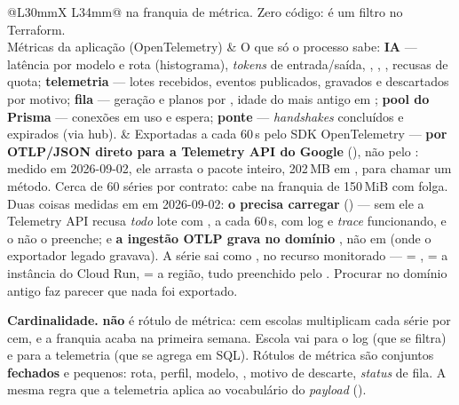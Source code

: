 \begin{tabularx}{\linewidth}{@{}L{30mm}X L{34mm}@{}}
  na franquia de métrica. Zero código: é um filtro no Terraform.\\
Métricas da aplicação (OpenTelemetry) & O que só o processo sabe:
  \textbf{IA} --- latência por modelo e rota (histograma), \emph{tokens}
  de entrada/saída, , , ,
  recusas de quota; \textbf{telemetria} --- lotes recebidos, eventos
  publicados, gravados e descartados por motivo; \textbf{fila} --- geração e
  planos por , idade do mais antigo em ; \textbf{pool
  do Prisma} --- conexões em uso e espera; \textbf{ponte} --- \emph{handshakes}
  concluídos e expirados (via hub). &
  Exportadas a cada 60\,s pelo SDK OpenTelemetry --- \textbf{por OTLP/JSON
  direto para a Telemetry API do Google} (),
  não pelo : medido
  em 2026-09-02, ele arrasta o pacote  inteiro, 202\,MB em
  , para chamar um método. Cerca de 60 séries por contrato:
  cabe na franquia de 150\,MiB com folga. Duas coisas medidas em  em
  2026-09-02: \textbf{o  precisa carregar }
  () --- sem ele a Telemetry API recusa
  \emph{todo} lote com , a cada 60\,s, com log e \emph{trace}
  funcionando, e o  não o preenche; e \textbf{a ingestão OTLP
  grava no domínio }, não em
   (onde o exportador legado gravava). A série sai
  como , no
  recurso monitorado  ---  = ,
   = a instância do Cloud Run,  = a região, tudo
  preenchido pelo . Procurar no domínio antigo faz parecer que
  nada foi exportado.\\
\bottomrule
\end{tabularx}

\begin{atencao}
\textbf{Cardinalidade.}  \textbf{não} é rótulo de métrica:
cem escolas multiplicam cada série por cem, e a franquia acaba na primeira
semana. Escola vai para o log (que se filtra) e para a telemetria (que se
agrega em SQL). Rótulos de métrica são conjuntos \textbf{fechados} e pequenos:
rota, perfil, modelo, , motivo de descarte, \emph{status}
de fila. A mesma regra que a telemetria aplica ao vocabulário do
\emph{payload} ().
\end{atencao}

